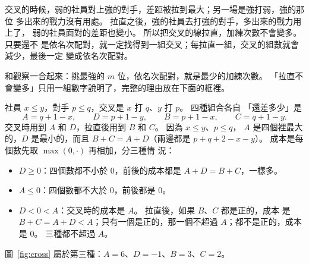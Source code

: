 \begin{center}
\label{fig:cross}
\end{center}

交叉的時候，弱的社員對上強的對手，差距被拉到最大；另一場是強打弱，強的那位
多出來的戰力沒有用處。 拉直之後，強的社員去打強的對手，多出來的戰力用上了，
弱的社員面對的差距也變小。 所以把交叉的線拉直，加練次數不會變多。 只要還不
是依名次配對，就一定找得到一組交叉；每拉直一組，交叉的組數就會減少，最後一定
變成依名次配對。

和觀察一合起來：挑最強的 $m$ 位，依名次配對，就是最少的加練次數。 「拉直不
會變多」只用一組數字說明了，完整的理由放在下面的框裡。

\begin{whybox}[拉直不會變多]
社員 $x \le y$，對手 $p \le q$，交叉是 $x$ 打 $q$、$y$ 打 $p$。 四種組合各自
「還差多少」是
\[
A = q + 1 - x,\qquad D = p + 1 - y,\qquad B = p + 1 - x,\qquad C = q + 1 - y.
\]
交叉時用到 $A$ 和 $D$，拉直後用到 $B$ 和 $C$。 因為 $x \le y$、$p \le q$，
$A$ 是四個裡最大的，$D$ 是最小的，而且 $B + C = A + D$（兩邊都是
$p + q + 2 - x - y$）。 成本是每個數先取 $\max(0, \cdot)$ 再相加，分三種情
況：

\begin{itemize}
\item $D \ge 0$：四個數都不小於 $0$，前後的成本都是 $A + D = B + C$，一樣多。
\item $A \le 0$：四個數都不大於 $0$，前後都是 $0$。
\item $D < 0 < A$：交叉時的成本是 $A$。 拉直後，如果 $B$、$C$ 都是正的，成本
是 $B + C = A + D < A$；只有一個是正的，那一個不超過 $A$；都不是正的，成本是
$0$。 三種都不超過 $A$。
\end{itemize}

圖~\ref{fig:cross} 屬於第三種：$A = 6$、$D = -1$、$B = 3$、$C = 2$。
\end{whybox}

